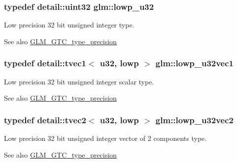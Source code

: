 \subsubsection[{\texorpdfstring{lowp\+\_\+u32}{lowp_u32}}]{\setlength{\rightskip}{0pt plus 5cm}typedef detail\+::uint32 {\bf glm\+::lowp\+\_\+u32}}\hypertarget{group__gtc__type__precision_gaba06fae1dd98ca50c017e68345df0365}{}\label{group__gtc__type__precision_gaba06fae1dd98ca50c017e68345df0365}
Low precision 32 bit unsigned integer type. \begin{DoxySeeAlso}{See also}
\hyperlink{group__gtc__type__precision}{G\+L\+M\+\_\+\+G\+T\+C\+\_\+type\+\_\+precision} 
\end{DoxySeeAlso}
\subsubsection[{\texorpdfstring{lowp\+\_\+u32vec1}{lowp_u32vec1}}]{\setlength{\rightskip}{0pt plus 5cm}typedef detail\+::tvec1$<$ u32, lowp $>$ {\bf glm\+::lowp\+\_\+u32vec1}}\hypertarget{group__gtc__type__precision_ga579d71c2ae1225b689aaab0bc7d33146}{}\label{group__gtc__type__precision_ga579d71c2ae1225b689aaab0bc7d33146}
Low precision 32 bit unsigned integer scalar type. \begin{DoxySeeAlso}{See also}
\hyperlink{group__gtc__type__precision}{G\+L\+M\+\_\+\+G\+T\+C\+\_\+type\+\_\+precision} 
\end{DoxySeeAlso}
\subsubsection[{\texorpdfstring{lowp\+\_\+u32vec2}{lowp_u32vec2}}]{\setlength{\rightskip}{0pt plus 5cm}typedef detail\+::tvec2$<$ u32, lowp $>$ {\bf glm\+::lowp\+\_\+u32vec2}}\hypertarget{group__gtc__type__precision_ga2f588e15c609987b89bd03f50b2a492d}{}\label{group__gtc__type__precision_ga2f588e15c609987b89bd03f50b2a492d}
Low precision 32 bit unsigned integer vector of 2 components type. \begin{DoxySeeAlso}{See also}
\hyperlink{group__gtc__type__precision}{G\+L\+M\+\_\+\+G\+T\+C\+\_\+type\+\_\+precision} 
\end{DoxySeeAlso}
